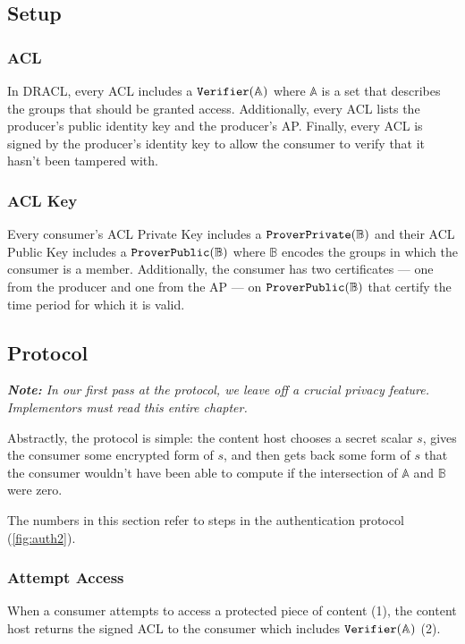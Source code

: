 \documentclass[pdftex,12pt,a4papaer,twoside,notitlepage]{report}
\newcommand{\note}[1]{\vspace{1em} \begin{spacing}{1}\textit{\textbf{Note:} #1}\end{spacing}\vspace{1em}}
\begin{document}
\subsection{Setup}

\subsubsection{ACL}

In DRACL, every ACL includes a $\operatorname{\mathtt{Verifier}}(\mathbb{A})$ where $\mathbb{A}$ is a set that describes
the groups that should be granted access. Additionally, every ACL lists the
producer's public identity key and the producer's AP. Finally, every ACL is
signed by the producer's identity key to allow the consumer to verify that it
hasn't been tampered with.

\subsubsection{ACL Key}
\label{sec:proto-acl-key}

Every consumer's ACL Private Key includes a $\operatorname{\mathtt{ProverPrivate}}(\mathbb{B})$ and their ACL Public Key
includes a $\operatorname{\mathtt{ProverPublic}}(\mathbb{B})$ where $\mathbb{B}$ encodes the groups in which the consumer is
a member. Additionally, the consumer has two certificates --- one from the
producer and one from the AP --- on $\operatorname{\mathtt{ProverPublic}}(\mathbb{B})$ that certify the time period for which
it is valid.

\subsection{Protocol}

\note{In our first pass at the protocol, we leave off a crucial privacy feature.
  Implementors must read this entire chapter.}

Abstractly, the protocol is simple: the content host chooses a secret scalar
$s$, gives the consumer some encrypted form of $s$, and then gets back some form
of $s$ that the consumer wouldn't have been able to compute if the intersection
of $\mathbb{A}$ and $\mathbb{B}$ were zero.

The numbers in this section refer to steps in the authentication protocol
(\cref{fig:auth2}).

\subsubsection{Attempt Access}
\label{sec:proto-attempt-access}

When a consumer attempts to access a protected piece of content (1), the content
host returns the signed ACL to the consumer which includes $\operatorname{\mathtt{Verifier}}(\mathbb{A})$ (2).
\end{document}
